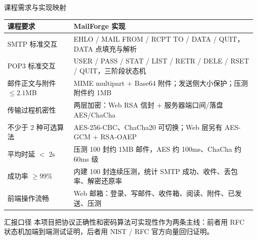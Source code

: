 \documentclass[aspectratio=169,10pt]{beamer}
\begin{document}
\begin{frame}{课程需求与实现映射}
  \small
  \begin{table}
    \centering
    \begin{tabular}{p{}p{}}
      \toprule
      \textbf{课程要求} & \textbf{MailForge 实现} \\
      \midrule
      SMTP 标准交互 & EHLO / MAIL FROM / RCPT TO / DATA / QUIT，DATA 点填充与解析 \\
      POP3 标准交互 & USER / PASS / STAT / LIST / RETR / DELE / RSET / QUIT，三阶段状态机 \\
      邮件正文与附件 $\le 2.1$MB & MIME multipart + Base64 附件；发送侧大小保护；压测附件约 1MB \\
      传输过程机密性 & 两层加密：Web RSA 信封 + 服务器端口间/落盘 AES/ChaCha \\
      不少于 2 种可选算法 & AES-256-CBC、ChaCha20 可切换；Web 层另有 AES-GCM + RSA-OAEP \\
      平均时延 $<$ 2s & 压测 100 封约 1MB 邮件，AES 约 100ms、ChaCha 约 60ms 级 \\
      成功率 $\ge 99\%$ & 内建 100 封连续压测，统计 SMTP 成功、收件、丢包率、解密还原率 \\
      前端操作流畅 & Web 邮箱：登录、写邮件、收件箱、阅读、附件、已发送、压测 \\
      \bottomrule
    \end{tabular}
  \end{table}
  \vspace{0.5em}
  \begin{alertblock}{汇报口径}
    本项目把协议正确性和密码算法可实现性作为两条主线：前者用 RFC 状态机加端到端测试证明，后者用 NIST / RFC 官方向量回归证明。
  \end{alertblock}
\end{frame}
\end{document}
